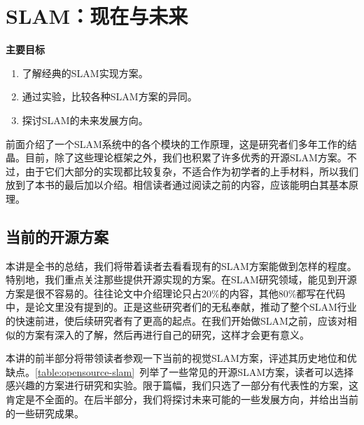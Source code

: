 \chapter{SLAM：现在与未来}
\begin{mdframed}  
	\textbf{主要目标}
	\begin{enumerate}[labelindent=0em,leftmargin=1.5em]
		\item 了解经典的SLAM实现方案。
		\item 通过实验，比较各种SLAM方案的异同。
		\item 探讨SLAM的未来发展方向。
	\end{enumerate}
\end{mdframed}

前面介绍了一个SLAM系统中的各个模块的工作原理，这是研究者们多年工作的结晶。目前，除了这些理论框架之外，我们也积累了许多优秀的开源SLAM方案。不过，由于它们大部分的实现都比较复杂，不适合作为初学者的上手材料，所以我们放到了本书的最后加以介绍。相信读者通过阅读之前的内容，应该能明白其基本原理。

\newpage 
\section{当前的开源方案}
本讲是全书的总结，我们将带着读者去看看现有的SLAM方案能做到怎样的程度。特别地，我们重点关注那些提供开源实现的方案。在SLAM研究领域，能见到开源方案是很不容易的。往往论文中介绍理论只占20\%的内容，其他80\%都写在代码中，是论文里没有提到的。正是这些研究者们的无私奉献，推动了整个SLAM行业的快速前进，使后续研究者有了更高的起点。在我们开始做SLAM之前，应该对相似的方案有深入的了解，然后再进行自己的研究，这样才会更有意义。

本讲的前半部分将带领读者参观一下当前的视觉SLAM方案，评述其历史地位和优缺点。\autoref{table:opensource-slam}~列举了一些常见的开源SLAM方案，读者可以选择感兴趣的方案进行研究和实验。限于篇幅，我们只选了一部分有代表性的方案，这肯定是不全面的。在后半部分，我们将探讨未来可能的一些发展方向，并给出当前的一些研究成果。

